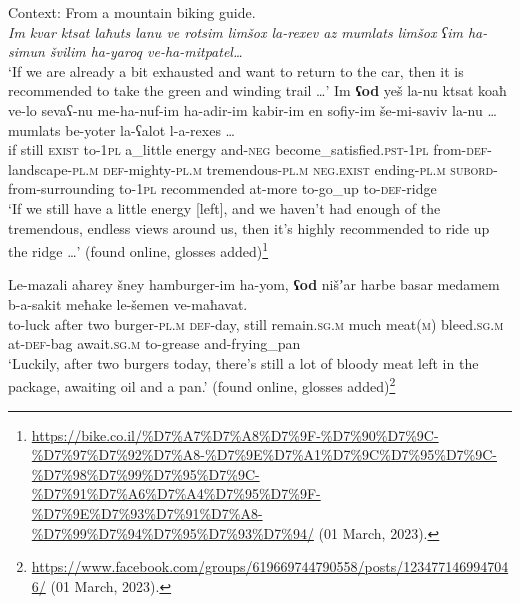 \begin{exe}
	\ex Context: From a mountain biking guide.\label{appendixHebrewOdScalar1}\\
\textit{Im kvar ktsat laħuts lanu ve rotsim limšox la-rexev az mumlats limšox ʕim ha-simun švilim ha-yaroq ve-ha-mitpatel…}\\
	\lq If we are already a bit exhausted and want to return to the car, then it is recommended to take  the green and winding trail …\rq{}
	\exi{}
	\gll Im \textbf{ʕod} yeš la-nu ktsat koaħ ve-lo sevaʕ-nu me-ha-nuf-im ha-adir-im kabir-im en sofiy-im še-mi-saviv la-nu  … mumlats be-yoter la-ʕalot l-a-rexes … \\
	if still \textsc{exist} to-1\textsc{pl} a\_little energy and-\textsc{neg} become\_satisfied.\textsc{pst}-1\textsc{pl} from-\textsc{def}-landscape-\textsc{pl}.\textsc{m} \textsc{def}-mighty-\textsc{pl}.\textsc{m} tremendous-\textsc{pl}.\textsc{m} \textsc{neg}.\textsc{exist} ending-\textsc{pl}.\textsc{m} \textsc{subord}-from-surrounding  to-1\textsc{pl} {} recommended at-more to-go\_up to-\textsc{def}-ridge\\
	\glt \lq If we still have a little energy [left], and we haven't had enough of the tremendous, endless views around us, then it's highly recommended to ride up the ridge …\rq{ }(found online, glosses added)\footnote{\url{https://bike.co.il/\%D7\%A7\%D7\%A8\%D7\%9F-\%D7\%90\%D7\%9C-\%D7\%97\%D7\%92\%D7\%A8-\%D7\%9E\%D7\%A1\%D7\%9C\%D7\%95\%D7\%9C-\%D7\%98\%D7\%99\%D7\%95\%D7\%9C-\%D7\%91\%D7\%A6\%D7\%A4\%D7\%95\%D7\%9F-\%D7\%9E\%D7\%93\%D7\%91\%D7\%A8-\%D7\%99\%D7\%94\%D7\%95\%D7\%93\%D7\%94/} (01 March, 2023).}

	\ex \label{appendixHebrewOdScalar2}
	\gll Le-mazali aħarey šney hamburger-im ha-yom, \textbf{ʕod} nišʼar harbe basar medamem b-a-sakit meħake le-šemen ve-maħavat.\\
to-luck after two burger-\textsc{pl}.\textsc{m} \textsc{def}-day, still remain.\textsc{sg}.\textsc{m} much meat(\textsc{m}) bleed.\textsc{sg}.\textsc{m} at-\textsc{def}-bag await.\textsc{sg}.\textsc{m} to-grease and-frying\_pan\\
\glt \lq Luckily, after two burgers today, there's still a lot of bloody meat left in the package, awaiting oil and a pan.\rq{ }(found online, glosses added)\footnote{\url{https://www.facebook.com/groups/619669744790558/posts/1234771469947046/} (01 March, 2023).}


\end{exe}
